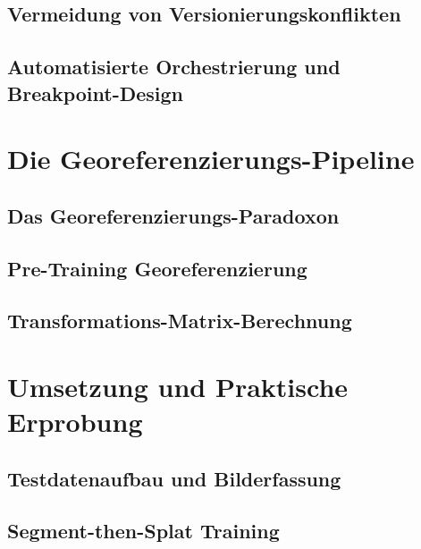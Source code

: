 \documentclass[12pt,twoside=false,a4paper,parskip]{scrbook}
\begin{document}
\section{Vermeidung von Versionierungskonflikten}

\section{Automatisierte Orchestrierung und Breakpoint-Design}


\chapter{Die Georeferenzierungs-Pipeline} \label{sec:georef}

\section{Das Georeferenzierungs-Paradoxon}

\section{Pre-Training Georeferenzierung}

\section{Transformations-Matrix-Berechnung}


\chapter{Umsetzung und Praktische Erprobung} \label{sec:umsetzung}

\section{Testdatenaufbau und Bilderfassung}

\section{Segment-then-Splat Training}
\end{document}
